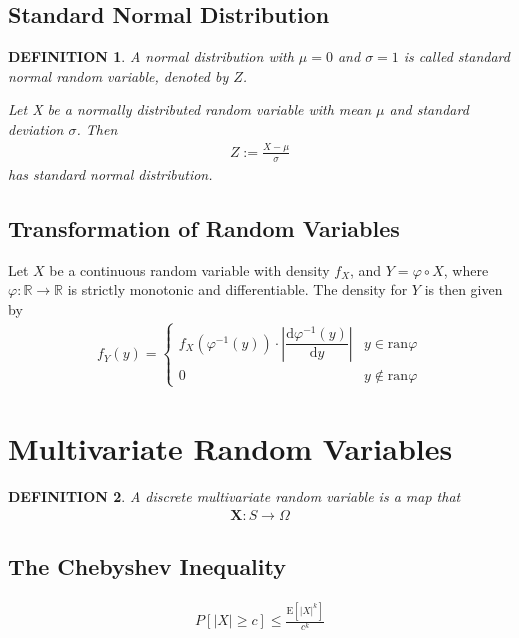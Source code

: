 \documentclass[11pt,a4paper]{article}
\newcommand{\dd}{\mathrm{d}}
\newcommand{\dy}{\dd y}
\newcommand{\XX}{\mathbf{X}}
\newtheorem*{definition}{\bf DEFINITION}
\begin{document}
\subsection{Standard Normal Distribution}
\begin{definition}
    A normal distribution with $\mu=0$ and $\sigma=1$ is called {\it standard normal}
    random variable, denoted by $Z$.

    Let X be a normally distributed random variable with mean
    $\mu$ and standard deviation $\sigma$. Then
    \begin{gather}
        Z:=\frac{X-\mu}{\sigma}
    \end{gather}
    has standard normal distribution.
\end{definition}


\subsection{Transformation of Random Variables}
Let $X$ be a continuous random variable with density $f_X$, and $Y=\varphi\circ X$,
where $\varphi:\mathbb{R}\rightarrow\mathbb{R}$ is strictly monotonic and differentiable.
The density for $Y$ is then given by
\begin{gather*}
    f_Y(y)=\begin{cases*}
        f_X(\varphi^{-1}(y))\cdot\left\vert \dfrac{\dd\varphi^{-1}(y)}{\dy}\right\vert & y\in\mathrm{ran }\varphi    \\
        0                                                                              & y\notin\mathrm{ran }\varphi
    \end{cases*}
\end{gather*}

\section{Multivariate Random Variables}
\begin{definition}
    A discrete multivariate random variable is a map that
    \begin{gather*}
        \XX:S\rightarrow\varOmega
    \end{gather*}
\end{definition}

\subsection{The Chebyshev Inequality}
\begin{gather*}
    P[\left\lvert X\right\rvert \ge c]\le\frac{\mathrm{E}[\left\lvert X\right\rvert^k]}{c^k}
\end{gather*}
\end{document}
